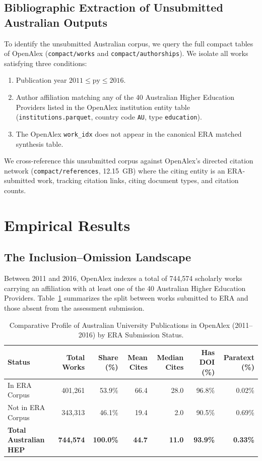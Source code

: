 \documentclass[11pt,a4paper]{article}
\begin{document}
\subsection{Bibliographic Extraction of Unsubmitted Australian Outputs}
To identify the unsubmitted Australian corpus, we query the full compact tables of OpenAlex (\texttt{compact/works} and \texttt{compact/authorships}). We isolate all works satisfying three conditions:
\begin{enumerate}
    \item Publication year $2011 \le \text{py} \le 2016$.
    \item Author affiliation matching any of the 40 Australian Higher Education Providers listed in the OpenAlex institution entity table (\texttt{institutions.parquet}, country code \texttt{AU}, type \texttt{education}).
    \item The OpenAlex \texttt{work\_idx} does not appear in the canonical ERA matched synthesis table.
\end{enumerate}
We cross-reference this unsubmitted corpus against OpenAlex's directed citation network (\texttt{compact/references}, 12.15~GB) where the citing entity is an ERA-submitted work, tracking citation links, citing document types, and citation counts.

\section{Empirical Results}

\subsection{The Inclusion--Omission Landscape}

Between 2011 and 2016, OpenAlex indexes a total of 744,574 scholarly works carrying an affiliation with at least one of the 40 Australian Higher Education Providers. Table~\ref{tab:inclusion_landscape} summarizes the split between works submitted to ERA and those absent from the assessment submission.

\begin{table}[htbp]
\centering
\footnotesize
\caption{Comparative Profile of Australian University Publications in OpenAlex (2011--2016) by ERA Submission Status.}
\label{tab:inclusion_landscape}
\begin{tabularx}{\textwidth}{lrrrrrr}
\toprule
\textbf{Status} & \textbf{Total Works} & \textbf{Share (\%)} & \textbf{Mean Cites} & \textbf{Median Cites} & \textbf{Has DOI (\%)} & \textbf{Paratext (\%)} \\
\midrule
In ERA Corpus       & 401,261 & 53.9\% & 66.4 & 28.0 & 96.8\% & 0.02\% \\
Not in ERA Corpus   & 343,313 & 46.1\% & 19.4 &  2.0 & 90.5\% & 0.69\% \\
\midrule
\textbf{Total Australian HEP} & \textbf{744,574} & \textbf{100.0\%} & \textbf{44.7} & \textbf{11.0} & \textbf{93.9\%} & \textbf{0.33\%} \\
\bottomrule
\end{tabularx}
\end{table}
\end{document}
